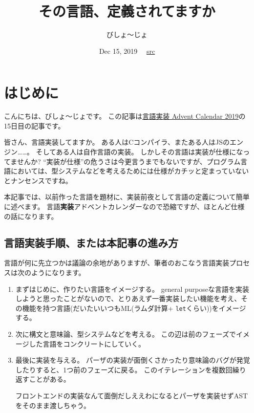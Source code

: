 \documentclass{ltjsarticle}
\author{びしょ〜じょ}
\title{その言語、定義されてますか}
\date{Dec 15, 2019 \ \  {\small \href{https://github.com/nymphium/nymphium.github.io/tree/source/src/2019/12/15/『その言語、定義されてますか』/main.tex}{src}}}
\begin{document}
\maketitle

\section{はじめに}
こんにちは、びしょ〜じょです。
この記事は\href{https://qiita.com/advent-calendar/2019/lang_dev}{言語実装 Advent Calendar 2019}の15日目の記事です。

皆さん、言語実装してますか。
ある人はCコンパイラ、またある人はJSのエンジン……。
そしてある人は自作言語の実装。
しかしその言語は実装が仕様になってませんか?
``実装が仕様''の危うさは今更言うまでもないですが、プログラム言語においては、型システムなどを考えるためには仕様がカチッと定まっていないとナンセンスですね。

本記事では、以前作った言語\href{https://github.com/nymphium/lambdaeff}{\lambdaeff}を題材に、実装前夜として言語の定義について簡単に述べます。
言語\textbf{実装}アドベントカレンダーなので恐縮ですが、ほとんど仕様の話になります。

\subsection{言語実装手順、または本記事の進み方}
言語が何に先立つかは議論の余地がありますが、筆者のおこなう言語実装プロセスは次のようになります。

\begin{enumerate}
  \item\label{enum:proc1}
    まずはじめに、作りたい言語をイメージする。
    general purposeな言語を実装しようと思ったことがないので、とりあえず一番実装したい機能を考え、その機能を持つ言語(だいたいいつもML(ラムダ計算+ \lstinline{let}くらい))をイメージする。

  \item\label{enum:proc2}
    次に構文と意味論、型システムなどを考える。
    この辺は前のフェーズでイメージした言語をコンクリートにしていく。

  \item\label{enum:proc3}
    最後に実装を与える。
    パーザの実装が面倒くさかったり意味論のバグが発覚したりすると、1つ前のフェーズに戻る。
    このイテレーションを複数回繰り返すことがある。

    フロントエンドの実装なんて面倒だしええわになるとパーザを実装せずASTをそのまま渡しちゃう。
\end{enumerate}
\end{document}
